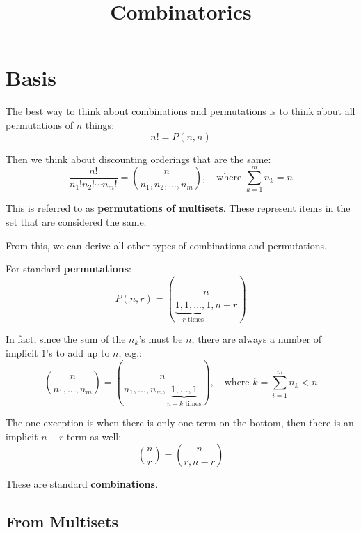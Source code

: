 \documentclass{article}
\title{Combinatorics}
\begin{document}
    \maketitle

    \tableofcontents

    \section{Basis}

    The best way to think about combinations and permutations is to think about all permutations of $n$ things: \begin{equation}
        n! = P(n, n)
    \end{equation}

    Then we think about discounting orderings that are the same: \begin{equation}
        \frac{n!}{n_1! n_2! \cdots n_m!} = {n \choose n_1, n_2, ..., n_m}, \quad \text{where } \sum_{k = 1}^m{n_k} = n
    \end{equation}

    This is referred to as \textbf{permutations of multisets}. These represent items in the set that are considered the same.

    From this, we can derive all other types of combinations and permutations.

    For standard \textbf{permutations}: \begin{equation}
        P(n, r) = {n \choose \underbrace{1, 1, ..., 1}_{r \text{ times}}, n - r}
    \end{equation}

    In fact, since the sum of the $n_k$'s must be $n$, there are always a number of implicit 1's to add up to $n$, e.g.: \begin{equation}
        {n \choose n_1, ..., n_m} = {n \choose n_1, ..., n_m, \underbrace{1, ..., 1}_{n - k \text{ times}}}, \quad \text{where } k = \sum_{i = 1}^m{n_k} < n
    \end{equation}

    The one exception is when there is only one term on the bottom, then there is an implicit $n - r$ term as well: \begin{equation}
        {n \choose r} = {n \choose r, n - r}
    \end{equation}

    These are standard \textbf{combinations}.

    \subsection{From Multisets}
\end{document}
